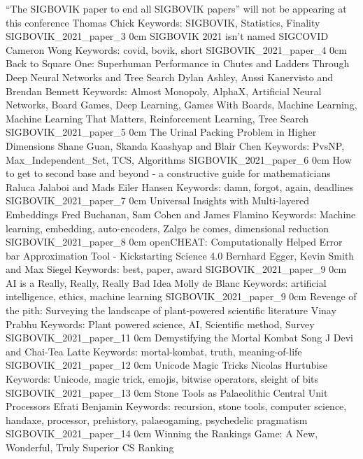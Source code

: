 \addpaper
	{``The SIGBOVIK paper to end all SIGBOVIK papers'' will not be appearing at this conference}
	{Thomas Chick}
	{Keywords: SIGBOVIK, Statistics, Finality}
	{SIGBOVIK_2021_paper_3}
	{0cm}
	{}
\addpaper
	{SIGBOVIK 2021 isn't named SIGCOVID}
	{Cameron Wong}
	{Keywords: covid, bovik, short}
	{SIGBOVIK_2021_paper_4}
	{0cm}
	{}
\addpaper
	{Back to Square One: Superhuman Performance in Chutes and Ladders Through Deep Neural Networks and Tree Search}
	{Dylan Ashley, Anssi Kanervisto and Brendan Bennett}
	{Keywords: Almost Monopoly, AlphaX, Artificial Neural Networks, Board Games, Deep Learning, Games With Boards, Machine Learning, Machine Learning That Matters, Reinforcement Learning, Tree Search}
	{SIGBOVIK_2021_paper_5}
	{0cm}
	{}
\addpaper
	{The Urinal Packing Problem in Higher Dimensions}
	{Shane Guan, Skanda Kaashyap and Blair Chen}
	{Keywords: PvsNP, Max\_Independent\_Set, TCS, Algorithms}
	{SIGBOVIK_2021_paper_6}
	{0cm}
	{}
\addpaper
	{How to get to second base and beyond - a constructive guide for mathematicians}
	{Raluca Jalaboi and Mads Eiler Hansen}
	{Keywords: damn, forgot, again, deadlines}
	{SIGBOVIK_2021_paper_7}
	{0cm}
	{}
\addpaper
	{Universal Insights with Multi-layered Embeddings}
	{Fred Buchanan, Sam Cohen and James Flamino}
	{Keywords: Machine learning, embedding, auto-encoders, Zalgo he comes, dimensional reduction}
	{SIGBOVIK_2021_paper_8}
	{0cm}
	{}
\addpaper
	{openCHEAT: Computationally Helped Error bar Approximation Tool - Kickstarting Science 4.0}
	{Bernhard Egger, Kevin Smith and Max Siegel}
	{Keywords: best, paper, award}
	{SIGBOVIK_2021_paper_9}
	{0cm}
	{}
\addpaper
	{AI is a Really, Really, Really Bad Idea}
	{Molly de Blanc}
	{Keywords: artificial intelligence, ethics, machine learning}
	{SIGBOVIK_2021_paper_9}
	{0cm}
	{}
\addpaper
	{Revenge of the pith: Surveying the landscape of plant-powered scientific literature}
	{Vinay Prabhu}
	{Keywords: Plant powered science, AI, Scientific method, Survey}
	{SIGBOVIK_2021_paper_11}
	{0cm}
	{}
\addpaper
	{Demystifying the Mortal Kombat Song}
	{J Devi and Chai-Tea Latte}
	{Keywords: mortal-kombat, truth, meaning-of-life}
	{SIGBOVIK_2021_paper_12}
	{0cm}
	{}
\addpaper
	{Unicode Magic Tricks}
	{Nicolas Hurtubise}
	{Keywords: Unicode, magic trick, emojis, bitwise operators, sleight of bits}
	{SIGBOVIK_2021_paper_13}
	{0cm}
	{}
\addpaper
	{Stone Tools as Palaeolithic Central Unit Processors}
	{Efrati Benjamin}
	{Keywords: recursion, stone tools, computer science, handaxe, processor, prehistory, palaeogaming, psychedelic pragmatism}
	{SIGBOVIK_2021_paper_14}
	{0cm}
	{}
\addpaper
	{Winning the Rankings Game: A New, Wonderful, Truly Superior CS Ranking}
